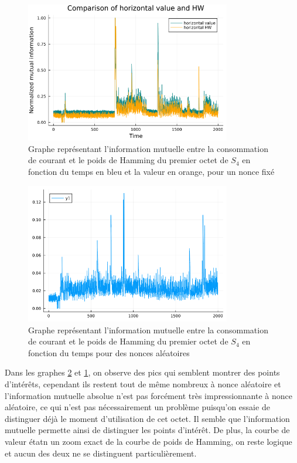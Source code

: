 \documentclass[12pt]{article}
\begin{document}
	\begin{figure}[H]
		\centering
		\includegraphics[width=0.8\textwidth]{img_files/horizontal_one_byte}
		\caption{Graphe représentant l'information mutuelle entre la consommation de courant et le poids de Hamming du premier octet de $S_4$ en fonction du temps en bleu et la valeur en orange, pour un nonce fixé}
		\label{hHW&val}
	\end{figure}
	
	\begin{figure}[H]
		\centering
		\includegraphics[width=0.8\textwidth]{img_files/hHW_one_byte}
		\caption{Graphe représentant l'information mutuelle entre la consommation de courant et le poids de Hamming du premier octet de $S_4$ en fonction du temps pour des nonces aléatoires}
		\label{hHW1}
	\end{figure}
	
	Dans les graphes \ref{hHW1} et \ref{hHW&val}, on observe des pics qui semblent montrer des points d'intérêts, cependant ils restent tout de même nombreux à nonce aléatoire et l'information mutuelle absolue n'est pas forcément très impressionnante à nonce aléatoire, ce qui n'est pas nécessairement un problème puisqu'on essaie de distinguer déjà le moment d'utilisation de cet octet. Il semble que l'information mutuelle permette ainsi de distinguer les points d'intérêt. De plus, la courbe de valeur étatn un zoom exact de la courbe de poids de Hamming, on reste logique et aucun des deux ne se distinguent particulièrement.
	
\end{document}
